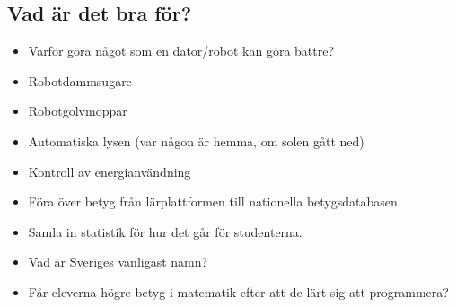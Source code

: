 \subsection{Vad är det bra för?}

\begin{frame}
  \begin{question}
    \begin{itemize}
      \item Varför göra något som en dator/robot kan göra bättre?
    \end{itemize}
  \end{question}
\end{frame}

\begin{frame}
  \begin{example}[Hemautomation]
    \begin{itemize}
      \item Robotdammsugare
      \item Robotgolvmoppar
      \item Automatiska lysen (var någon är hemma, om solen gått ned)
      \item Kontroll av energianvändning
    \end{itemize}
  \end{example}
\end{frame}

\begin{frame}
  \begin{example}
    \begin{itemize}
      \item Föra över betyg från lärplattformen till nationella 
        betygsdatabasen.
      \item Samla in statistik för hur det går för studenterna.
    \end{itemize}
  \end{example}

  \begin{example}
    \begin{itemize}
      \item Vad är Sveriges vanligast namn?
      \item Får eleverna högre betyg i matematik efter att de lärt sig att 
        programmera?
    \end{itemize}
  \end{example}
\end{frame}


